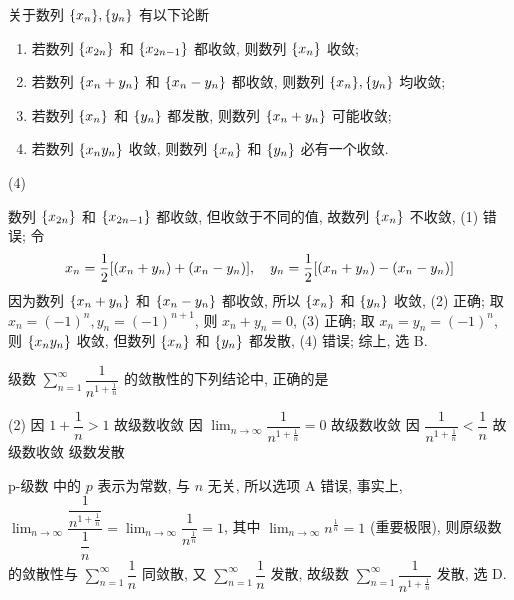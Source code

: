 \begin{example}
    关于数列 $\qty{x_n},\qty{y_n}$ 有以下论断
    \begin{enumerate}[label=(\arabic{*})]
        \item 若数列 $\qty{x_{2n}}$ 和 $\qty{x_{2n-1}}$ 都收敛, 则数列 $\qty{x_n}$ 收敛;
        \item 若数列 $\qty{x_n+y_n}$ 和 $\qty{x_n-y_n}$ 都收敛, 则数列 $\qty{x_n}, \qty{y_n}$ 均收敛;
        \item 若数列 $\qty{x_{n}}$ 和 $\qty{y_{n}}$ 都发散, 则数列 $\qty{x_n+y_n}$ 可能收敛;
        \item 若数列 $\qty{x_ny_n}$ 收敛, 则数列 $\qty{x_n}$ 和 $\qty{y_n}$ 必有一个收敛.
    \end{enumerate}
    \begin{tasks}(4)
    \end{tasks}
\end{example}
\begin{solution}
    数列 $\qty{x_{2n}}$ 和 $\qty{x_{2n-1}}$ 都收敛, 但收敛于不同的值, 故数列 $\qty{x_n}$ 不收敛, (1) 错误;
    令 $$
        x_n=\dfrac{1}{2}\qty[(x_n+y_n)+(x_n-y_n)],\quad y_n=\dfrac{1}{2}\qty[(x_n+y_n)-(x_n-y_n)]
    $$
    因为数列 $\qty{x_n+y_n}$ 和 $\qty{x_n-y_n}$ 都收敛, 所以 $\qty{x_n}$ 和 $\qty{y_n}$ 收敛, (2) 正确;
    取 $x_n=(-1)^n, y_n=(-1)^{n+1}$, 则 $x_n+y_n=0$, (3) 正确;
    取 $x_n=y_n=(-1)^n$, 则 $\qty{x_ny_n}$ 收敛, 但数列 $\qty{x_{n}}$ 和 $\qty{y_{n}}$ 都发散, (4) 错误;
    综上, 选 B.
\end{solution}

\begin{example}
    级数 $\displaystyle\sum_{n=1}^{\infty}\dfrac{1}{n^{1+\frac{1}{n}}}$ 的敛散性的下列结论中, 正确的是
    \begin{tasks}(2)
        \task 因 $1+\dfrac{1}{n}>1$ 故级数收敛
        \task 因 $\displaystyle\lim_{n\to\infty}\dfrac{1}{n^{1+\frac{1}{n}}}=0$ 故级数收敛
        \task 因 $\dfrac{1}{n^{1+\frac{1}{n}}}<\dfrac{1}{n}$ 故级数收敛
        \task 级数发散
    \end{tasks}
\end{example}
\begin{solution}
    p-级数 中的 $p$ 表示为常数, 与 $n$ 无关, 所以选项 A 错误, 事实上, $\displaystyle \lim_{n\to\infty}\dfrac{\dfrac{1}{n^{1+\frac{1}{n}}}}{\dfrac{1}{n}}=\lim_{n\to\infty}\dfrac{1}{n^{\frac{1}{n}}}=1$, 其中 $\displaystyle\lim_{n\to\infty}n^{\frac{1}{n}}=1$ (重要极限),
    则原级数的敛散性与 $\displaystyle\sum_{n=1}^{\infty}\dfrac{1}{n}$ 同敛散, 又 $\displaystyle\sum_{n=1}^{\infty}\dfrac{1}{n}$ 发散, 故级数 $\displaystyle\sum_{n=1}^{\infty}\dfrac{1}{n^{1+\frac{1}{n}}}$ 发散, 选 D.
\end{solution}

